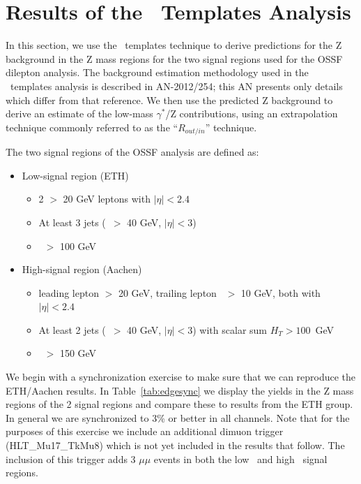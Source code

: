 \section{Results of the \MET\ Templates Analysis}
\label{sec:templates}

In this section, we use the \MET\ templates technique to derive predictions for the Z background in the Z mass regions for the 
two signal regions used for the OSSF dilepton analysis. The background estimation methodology used in the \MET\ templates analysis
is described in AN-2012/254; this AN presents only details which differ from that reference. 
We then use the predicted Z background to derive an estimate of the low-mass $\gamma^*$/Z contributions, 
using an extrapolation technique commonly referred to as the ``$R_{out/in}$'' technique.

The two signal regions of the OSSF analysis are defined as:

\begin{itemize}
\item Low-\MET signal region (ETH)
  \begin{itemize}
  \item 2 \pt $>$ 20 GeV leptons with $|\eta|<2.4$
  \item At least 3 jets (\pt\ $>$ 40 GeV, $|\eta|<3$)
  \item \MET\ $>$ 100 GeV
  \end{itemize}
\item High-\MET signal region (Aachen)
  \begin{itemize}
  \item leading lepton \pt $>$ 20 GeV, trailing lepton \pt\ $>$ 10 GeV, both with $|\eta|<2.4$
  \item At least 2 jets (\pt\ $>$ 40 GeV, $|\eta|<3$) with scalar sum $H_{T}>100$~GeV
  \item \MET\ $>$ 150 GeV
  \end{itemize}
\end{itemize}

We begin with a synchronization exercise to make sure that we can reproduce the ETH/Aachen results. In Table~\ref{tab:edgesync} we
display the yields in the Z mass regions of the 2 signal regions and compare these to results from the ETH group.
In general we are synchronized to 3\% or better in all channels. Note that for the purposes of this exercise we include an additional
dimuon trigger (HLT\_Mu17\_TkMu8) which is not yet included in the results that follow. The inclusion of this trigger adds 3 $\mu\mu$
events in both  the low \MET\ and high \MET\ signal regions.

